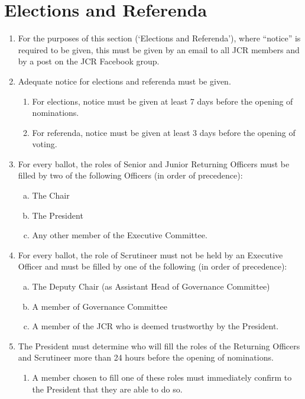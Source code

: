 \documentclass[12pt]{article}
\begin{document}
\section{Elections and Referenda}
\begin{enumerate}
    \item For the purposes of this section (‘Elections and Referenda’), where “notice” is required to be given, this must be given by an email to all JCR members and by a post on the JCR Facebook group.
    \item Adequate notice for elections and referenda must be given.
    \begin{enumerate}
        \item For elections, notice must be given at least 7 days before the opening of nominations.
        \item For referenda, notice must be given at least 3 days before the opening of voting.
    \end{enumerate}
    \item For every ballot, the roles of Senior and Junior Returning Officers must be filled by two of the following Officers (in order of precedence):
    \begin{enumerate}[(a)]
        \item The Chair
        \item The President
        \item Any other member of the Executive Committee.
    \end{enumerate}
    \item For every ballot, the role of Scrutineer must not be held by an Executive Officer and must be filled by one of the following (in order of precedence):
    \begin{enumerate}[(a)]
        \item The Deputy Chair (as Assistant Head of Governance Committee)
        \item A member of Governance Committee
        \item A member of the JCR who is deemed trustworthy by the President.
    \end{enumerate}
    \item The President must determine who will fill the roles of the Returning Officers and Scrutineer more than 24 hours before the opening of nominations.
    \begin{enumerate}
        \item A member chosen to fill one of these roles must immediately confirm to the President that they are able to do so.

\end{enumerate}
\end{enumerate}
\end{document}
